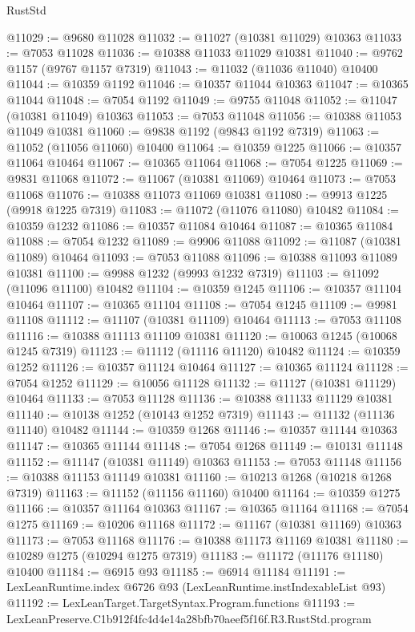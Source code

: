 \begin{lexlean}{RustStd}
\begin{coremodule}
@11029 := @9680 @11028
@11032 := @11027 (@10381 @11029) @10363
@11033 := @7053 @11028
@11036 := @10388 @11033 @11029 @10381
@11040 := @9762 @1157 (@9767 @1157 @7319)
@11043 := @11032 (@11036 @11040) @10400
@11044 := @10359 @1192
@11046 := @10357 @11044 @10363
@11047 := @10365 @11044
@11048 := @7054 @1192
@11049 := @9755 @11048
@11052 := @11047 (@10381 @11049) @10363
@11053 := @7053 @11048
@11056 := @10388 @11053 @11049 @10381
@11060 := @9838 @1192 (@9843 @1192 @7319)
@11063 := @11052 (@11056 @11060) @10400
@11064 := @10359 @1225
@11066 := @10357 @11064 @10464
@11067 := @10365 @11064
@11068 := @7054 @1225
@11069 := @9831 @11068
@11072 := @11067 (@10381 @11069) @10464
@11073 := @7053 @11068
@11076 := @10388 @11073 @11069 @10381
@11080 := @9913 @1225 (@9918 @1225 @7319)
@11083 := @11072 (@11076 @11080) @10482
@11084 := @10359 @1232
@11086 := @10357 @11084 @10464
@11087 := @10365 @11084
@11088 := @7054 @1232
@11089 := @9906 @11088
@11092 := @11087 (@10381 @11089) @10464
@11093 := @7053 @11088
@11096 := @10388 @11093 @11089 @10381
@11100 := @9988 @1232 (@9993 @1232 @7319)
@11103 := @11092 (@11096 @11100) @10482
@11104 := @10359 @1245
@11106 := @10357 @11104 @10464
@11107 := @10365 @11104
@11108 := @7054 @1245
@11109 := @9981 @11108
@11112 := @11107 (@10381 @11109) @10464
@11113 := @7053 @11108
@11116 := @10388 @11113 @11109 @10381
@11120 := @10063 @1245 (@10068 @1245 @7319)
@11123 := @11112 (@11116 @11120) @10482
@11124 := @10359 @1252
@11126 := @10357 @11124 @10464
@11127 := @10365 @11124
@11128 := @7054 @1252
@11129 := @10056 @11128
@11132 := @11127 (@10381 @11129) @10464
@11133 := @7053 @11128
@11136 := @10388 @11133 @11129 @10381
@11140 := @10138 @1252 (@10143 @1252 @7319)
@11143 := @11132 (@11136 @11140) @10482
@11144 := @10359 @1268
@11146 := @10357 @11144 @10363
@11147 := @10365 @11144
@11148 := @7054 @1268
@11149 := @10131 @11148
@11152 := @11147 (@10381 @11149) @10363
@11153 := @7053 @11148
@11156 := @10388 @11153 @11149 @10381
@11160 := @10213 @1268 (@10218 @1268 @7319)
@11163 := @11152 (@11156 @11160) @10400
@11164 := @10359 @1275
@11166 := @10357 @11164 @10363
@11167 := @10365 @11164
@11168 := @7054 @1275
@11169 := @10206 @11168
@11172 := @11167 (@10381 @11169) @10363
@11173 := @7053 @11168
@11176 := @10388 @11173 @11169 @10381
@11180 := @10289 @1275 (@10294 @1275 @7319)
@11183 := @11172 (@11176 @11180) @10400
@11184 := @6915 @93
@11185 := @6914 @11184
@11191 := LexLeanRuntime.index @6726 @93 (LexLeanRuntime.instIndexableList @93)
@11192 := LexLeanTarget.TargetSyntax.Program.functions
@11193 := LexLeanPreserve.C1b912f4fc4d4e14a28bfb70aeef5f16f.R3.RustStd.program

\end{coremodule}
\end{lexlean}

